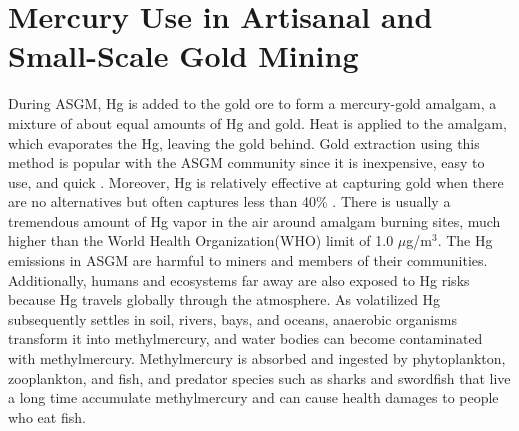 \section{Mercury Use in Artisanal and Small-Scale Gold Mining}

\begin{flushleft} 
During ASGM, Hg is added to the gold ore to form a mercury-gold amalgam, a mixture of about equal amounts of Hg and gold\cite{united_nations_environment_programme_reducing_2012}. Heat is applied to the amalgam, which evaporates the Hg, leaving the gold behind. Gold extraction using this method is popular with the ASGM community since it is inexpensive, easy to use, and quick \cite{united_nations_environment_programme_reducing_2012}. Moreover, Hg is relatively effective at capturing gold when there are no alternatives but often captures less than 40\% \cite{united_nations_environment_programme_developing_2015}. There is usually a tremendous amount of Hg vapor in the air around amalgam burning sites, much higher than the World Health Organization(WHO) limit of 1.0 $\mu$g/m$^{3}$\cite{gibb_mercury_2014}. The Hg emissions in ASGM are harmful to miners and members of their communities.
Additionally, humans and ecosystems far away are also exposed to Hg risks because Hg travels globally through the atmosphere. As volatilized Hg subsequently settles in soil, rivers, bays, and oceans, anaerobic organisms transform it into methylmercury, and water bodies can become contaminated with methylmercury\cite{united_nations_environment_programme_technical_2019}. Methylmercury is absorbed and ingested by phytoplankton, zooplankton, and fish, and predator species such as sharks and swordfish that live a long time accumulate methylmercury and can cause health damages to people who eat fish\cite{gibb_mercury_2014}. 
\end{flushleft}


